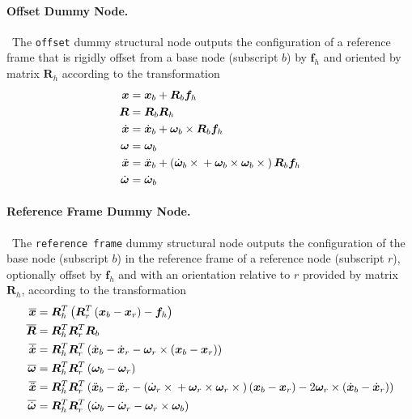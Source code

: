 \documentclass[10pt,dvips,fleqn,subeqn]{report}
\newcommand{\T}[1]{\bm{#1}}
\begin{document}
\paragraph{Offset Dummy Node.} \
The \texttt{offset} dummy structural node outputs the configuration
of a reference frame that is rigidly offset from a base node
(subscript $b$) by $\T{f}_h$ and oriented by matrix $\T{R}_h$ according 
to the transformation
\begin{subequations}
\begin{align}
	\T{x} &= \T{x}_b + \T{R}_b \T{f}_h \\
	\T{R} &= \T{R}_b \T{R}_h \\
	\dot{\T{x}} &= \dot{\T{x}}_b + \T{\omega}_b \times \T{R}_b \T{f}_h \\
	\T{\omega} &= \T{\omega}_b \\
	\ddot{\T{x}} &= \ddot{\T{x}}_b + \plbr{
		\dot{\T{\omega}}_b \times{}
		+ \T{\omega}_b \times \T{\omega}_b \times{}
	} \T{R}_b \T{f}_h \\
	\dot{\T{\omega}} &= \dot{\T{\omega}}_b
\end{align}
\end{subequations}


\paragraph{Reference Frame Dummy Node.} \
The \texttt{reference frame} dummy structural node
outputs the configuration of the base node (subscript $b$)
in the reference frame of a reference node (subscript $r$),
optionally offset by $\T{f}_h$ and with an orientation relative 
to $r$ provided by matrix $\T{R}_h$,
according to the transformation
\begin{subequations}
\begin{align}
	\overline{\T{x}} &= \T{R}_h^T \plbr{\T{R}_r^T \plbr{\T{x}_b - \T{x}_r} - \T{f}_h}\\
	\overline{\T{R}} &= \T{R}_h^T \T{R}_r^T \T{R}_b \\
	\overline{\dot{\T{x}}} &= \T{R}_h^T \T{R}_r^T \plbr{
		\dot{\T{x}}_b
		- \dot{\T{x}}_r
		- \T{\omega}_r\times\plbr{\T{x}_b - \T{x}_r}
	} \\
	\overline{\T{\omega}} &= \T{R}_h^T \T{R}_r^T \plbr{\T{\omega}_b - \T{\omega}_r} \\
	\overline{\ddot{\T{x}}} &= \T{R}_h^T \T{R}_r^T \plbr{
		\ddot{\T{x}}_b
		- \ddot{\T{x}}_r
		- \plbr{
			\dot{\T{\omega}}_r \times{}
			+ \T{\omega}_r \times \T{\omega}_r \times{}
		} \plbr{\T{x}_b - \T{x}_r}
		- 2 \T{\omega}_r \times \plbr{\dot{\T{x}}_b - \dot{\T{x}}_r}
	} \\
	\overline{\dot{\T{\omega}}} &= \T{R}_h^T \T{R}_r^T \plbr{
		\dot{\T{\omega}}_b
		- \dot{\T{\omega}}_r
		- \T{\omega}_r \times \T{\omega}_b
	}
\end{align}
\end{subequations}
\end{document}
